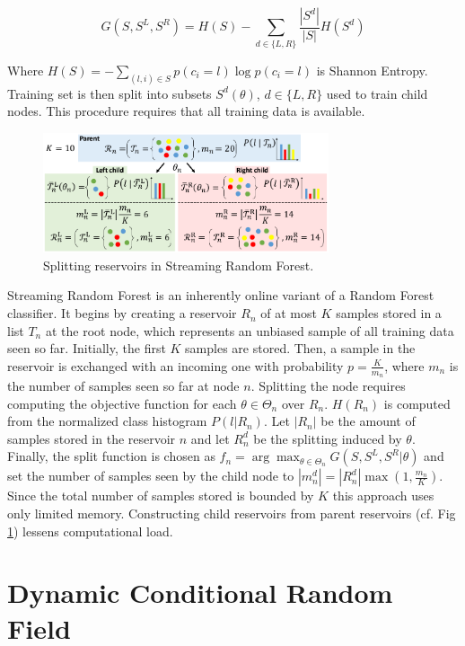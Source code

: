 \documentclass{llncs}
\begin{document}
  \begin{equation} \label{eq:infogain}
   G(S, S^L, S^R) = H(S) - \sum_{d \in \{L, R\}} \frac{|S^d|}{|S|}H(S^d)
  \end{equation}
  
  Where $H(S) = - \sum_{(l, i) \in S} p(c_i = l) \log{p(c_i = l)}$ is Shannon Entropy. Training set is then split into subsets $S^d(\theta)$, $d \in \{L, R\}$ used to train child nodes. This procedure requires that all training data is available.
  
\begin{figure}[!ht]
  \center
  \includegraphics[width=0.75\textwidth]{figures/forest}
  \caption{Splitting reservoirs in Streaming Random Forest.}
  \label{fig:forest}
\end{figure}
  
  Streaming Random Forest is an inherently online variant of a Random Forest classifier. It begins by creating a reservoir $R_n$ of at most $K$ samples stored in a list $T_n$ at the root node, which represents an unbiased sample of all training data seen so far. Initially, the first $K$ samples are stored. Then, a sample in the reservoir is exchanged with an incoming one with probability $p = \frac{K}{m_n}$, where $m_n$ is the number of samples seen so far at node $n$. Splitting the node requires computing the objective function for each $\theta \in \Theta_n$ over $R_n$. $H(R_n)$ is computed from the normalized class histogram $P(l|R_n)$. Let $|R_n|$ be the amount of samples stored in the reservoir $n$ and let $R_n^d$ be the splitting induced by $\theta$. Finally, the split function is chosen as $f_n = \arg \max_{\theta \in \Theta_n} G(S, S^L, S^R | \theta)$  and set the number of samples seen by the child node to $|m_n^d| = |R_n^d| \max {\left(1, \frac{m_n}{K}\right)}$. Since the total number of samples stored is bounded by $K$ this approach uses only limited memory. Constructing child reservoirs from parent reservoirs (cf. Fig \ref{fig:forest}) lessens computational load.

\section{Dynamic Conditional Random Field}
\end{document}
